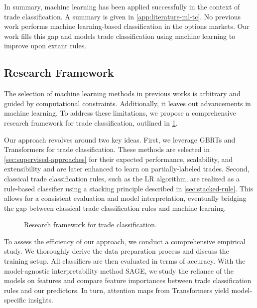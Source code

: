 In summary, machine learning has been applied successfully in the context of trade classification. A summary is given in \cref{app:literature-ml-tc}. No previous work performs machine learning-based classification in the options markets. Our work fills this gap and models trade classification using machine learning to improve upon extant rules.

\subsection{Research Framework}\label{sec:research-framework}

The selection of machine learning methods in previous works is arbitrary and guided by computational constraints. Additionally, it leaves out advancements in machine learning. To address these limitations, we propose a comprehensive research framework for trade classification, outlined in \cref{fig:research-framework}. 

Our approach revolves around two key ideas. First, we leverage \glspl{GBRT} and Transformers for trade classification. These methods are selected in \cref{sec:supervised-approaches} for their expected performance, scalability, and extensibility and are later enhanced to learn on partially-labeled trades. Second, classical trade classification rules, such as the \gls{LR} algorithm, are realized as a rule-based classifier using a stacking principle described in \cref{sec:stacked-rule}. This allows for a consistent evaluation and model interpretation, eventually bridging the gap between classical trade classification rules and machine learning.

\begin{figure}[!ht]
    \centering
    {\renewcommand\normalsize{\tiny}
        \normalsize
        }
    \caption[Research Framework]{Research framework for trade classification.}
    \label{fig:research-framework}
\end{figure}

To assess the efficiency of our approach, we conduct a comprehensive empirical study. We thoroughly derive the data preparation process and discuss the training setup. All classifiers are then evaluated in terms of accuracy. With the model-agnostic interpretability method \gls{SAGE}, we study the reliance of the models on features and compare feature importances between trade classification rules and our predictors. In turn, attention maps from Transformers yield model-specific insights.
